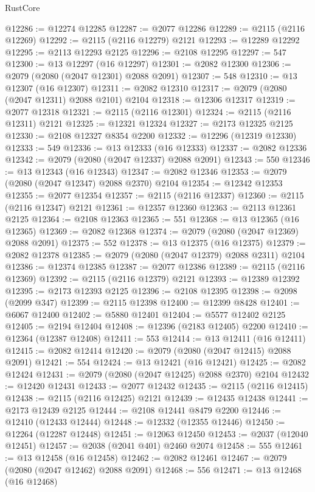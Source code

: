 \begin{lexlean}{RustCore}
\begin{coremodule}
@12286 := @12274 @12285
@12287 := @2077 @12286
@12289 := @2115 (@2116 @12269)
@12292 := @2115 (@2116 @12279) @2121
@12293 := @12289 @12292
@12295 := @2113 @12293 @2125
@12296 := @2108 @12295
@12297 := 547
@12300 := @13 @12297 (@16 @12297)
@12301 := @2082 @12300
@12306 := @2079 (@2080 (@2047 @12301) @2088 @2091)
@12307 := 548
@12310 := @13 @12307 (@16 @12307)
@12311 := @2082 @12310
@12317 := @2079 (@2080 (@2047 @12311) @2088 @2101) @2104
@12318 := @12306 @12317
@12319 := @2077 @12318
@12321 := @2115 (@2116 @12301)
@12324 := @2115 (@2116 @12311) @2121
@12325 := @12321 @12324
@12327 := @2173 @12325 @2125
@12330 := @2108 @12327 @8354 @2200
@12332 := @12296 (@12319 @12330)
@12333 := 549
@12336 := @13 @12333 (@16 @12333)
@12337 := @2082 @12336
@12342 := @2079 (@2080 (@2047 @12337) @2088 @2091)
@12343 := 550
@12346 := @13 @12343 (@16 @12343)
@12347 := @2082 @12346
@12353 := @2079 (@2080 (@2047 @12347) @2088 @2370) @2104
@12354 := @12342 @12353
@12355 := @2077 @12354
@12357 := @2115 (@2116 @12337)
@12360 := @2115 (@2116 @12347) @2121
@12361 := @12357 @12360
@12363 := @2113 @12361 @2125
@12364 := @2108 @12363
@12365 := 551
@12368 := @13 @12365 (@16 @12365)
@12369 := @2082 @12368
@12374 := @2079 (@2080 (@2047 @12369) @2088 @2091)
@12375 := 552
@12378 := @13 @12375 (@16 @12375)
@12379 := @2082 @12378
@12385 := @2079 (@2080 (@2047 @12379) @2088 @2311) @2104
@12386 := @12374 @12385
@12387 := @2077 @12386
@12389 := @2115 (@2116 @12369)
@12392 := @2115 (@2116 @12379) @2121
@12393 := @12389 @12392
@12395 := @2173 @12393 @2125
@12396 := @2108 @12395
@12398 := @2098 (@2099 @347)
@12399 := @2115 @12398
@12400 := @12399 @8428
@12401 := @6067 @12400
@12402 := @5880 @12401
@12404 := @5577 @12402 @2125
@12405 := @2194 @12404
@12408 := @12396 (@2183 @12405) @2200
@12410 := @12364 (@12387 @12408)
@12411 := 553
@12414 := @13 @12411 (@16 @12411)
@12415 := @2082 @12414
@12420 := @2079 (@2080 (@2047 @12415) @2088 @2091)
@12421 := 554
@12424 := @13 @12421 (@16 @12421)
@12425 := @2082 @12424
@12431 := @2079 (@2080 (@2047 @12425) @2088 @2370) @2104
@12432 := @12420 @12431
@12433 := @2077 @12432
@12435 := @2115 (@2116 @12415)
@12438 := @2115 (@2116 @12425) @2121
@12439 := @12435 @12438
@12441 := @2173 @12439 @2125
@12444 := @2108 @12441 @8479 @2200
@12446 := @12410 (@12433 @12444)
@12448 := @12332 (@12355 @12446)
@12450 := @12264 (@12287 @12448)
@12451 := @12063 @12450
@12453 := @2037 (@12040 @12451)
@12457 := @2038 (@2041 @401) @2460 @2074
@12458 := 555
@12461 := @13 @12458 (@16 @12458)
@12462 := @2082 @12461
@12467 := @2079 (@2080 (@2047 @12462) @2088 @2091)
@12468 := 556
@12471 := @13 @12468 (@16 @12468)

\end{coremodule}
\end{lexlean}
